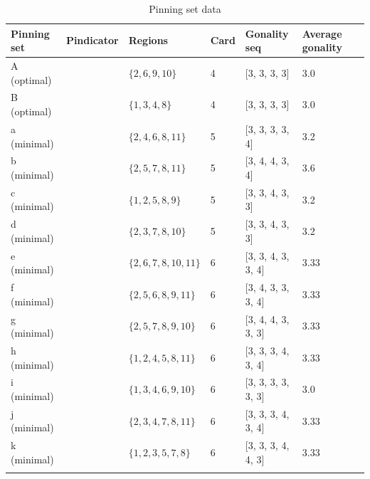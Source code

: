 \documentclass{article}%
\begin{document}
\begin{table}[ht]
	\caption{Pinning set data}
	\centering
	\renewcommand{\arraystretch}{1.5}
	\begin{tabularx}{\textwidth}{lXXXXXX}
		\toprule
			Pinning set & Pindicator & Regions & Card & Gonality seq & Average gonality\\
			\hline
			A (optimal) & {\Huge\textcolor{red0}{\textbullet}} & $\{2,6,9,10\}$ & 4 & [3, 3, 3, 3] & 3.0 \\
			B (optimal) & {\Huge\textcolor{red5}{\textbullet}} & $\{1,3,4,8\}$ & 4 & [3, 3, 3, 3] & 3.0 \\
			a (minimal) & {\Huge\textcolor{green0}{\textbullet}} & $\{2,4,6,8,11\}$ & 5 & [3, 3, 3, 3, 4] & 3.2 \\
			b (minimal) & {\Huge\textcolor{green1}{\textbullet}} & $\{2,5,7,8,11\}$ & 5 & [3, 4, 4, 3, 4] & 3.6 \\
			c (minimal) & {\Huge\textcolor{green2}{\textbullet}} & $\{1,2,5,8,9\}$ & 5 & [3, 3, 4, 3, 3] & 3.2 \\
			d (minimal) & {\Huge\textcolor{green3}{\textbullet}} & $\{2,3,7,8,10\}$ & 5 & [3, 3, 4, 3, 3] & 3.2 \\
			e (minimal) & {\Huge\textcolor{green4}{\textbullet}} & $\{2,6,7,8,10,11\}$ & 6 & [3, 3, 4, 3, 3, 4] & 3.33 \\
			f (minimal) & {\Huge\textcolor{green5}{\textbullet}} & $\{2,5,6,8,9,11\}$ & 6 & [3, 4, 3, 3, 3, 4] & 3.33 \\
			g (minimal) & {\Huge\textcolor{green6}{\textbullet}} & $\{2,5,7,8,9,10\}$ & 6 & [3, 4, 4, 3, 3, 3] & 3.33 \\
			h (minimal) & {\Huge\textcolor{green7}{\textbullet}} & $\{1,2,4,5,8,11\}$ & 6 & [3, 3, 3, 4, 3, 4] & 3.33 \\
			i (minimal) & {\Huge\textcolor{green8}{\textbullet}} & $\{1,3,4,6,9,10\}$ & 6 & [3, 3, 3, 3, 3, 3] & 3.0 \\
			j (minimal) & {\Huge\textcolor{green9}{\textbullet}} & $\{2,3,4,7,8,11\}$ & 6 & [3, 3, 3, 4, 3, 4] & 3.33 \\
			k (minimal) & {\Huge\textcolor{green10}{\textbullet}} & $\{1,2,3,5,7,8\}$ & 6 & [3, 3, 3, 4, 4, 3] & 3.33 \\
		\bottomrule \\ 
	\end{tabularx}
\end{table}

\newpage
\end{document}
